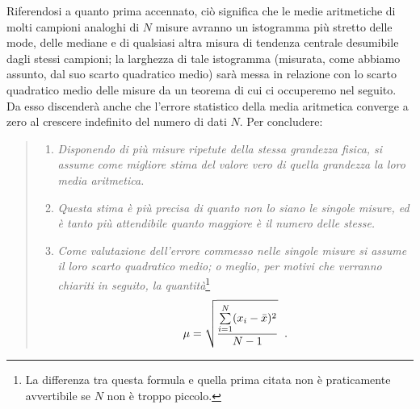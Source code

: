 Riferendosi a quanto prima accennato, ci\`o significa che le
medie aritmetiche di molti campioni analoghi di $N$ misure
avranno un istogramma pi\`u stretto delle mode, delle
mediane e di qualsiasi altra misura di tendenza centrale
desumibile dagli stessi campioni; la larghezza di tale
istogramma (misurata, come abbiamo assunto, dal suo scarto
quadratico medio) sar\`a messa in relazione con lo scarto
quadratico medio delle misure da un teorema di cui ci
occuperemo nel seguito.  Da esso discender\`a anche che
l'errore statistico della media aritmetica converge a zero
al crescere indefinito del numero di dati $N$.%
Per concludere:
\begin{quote}
  \begin{enumerate}
  \item \textit{Disponendo di pi\`u misure ripetute della
      stessa grandezza fisica, si assume come migliore stima
      del valore vero di quella grandezza la loro media
      aritmetica.}
  \item \textit{Questa stima \`e pi\`u precisa di quanto non
      lo siano le singole misure, ed \`e tanto pi\`u
      attendibile quanto maggiore \`e il numero delle
      stesse.}
  \item \textit{Come valutazione dell'errore commesso nelle
      singole misure si assume il loro scarto quadratico
      medio; o meglio, per motivi che verranno chiariti in
      seguito, la quantit\`a}\/\thinspace\footnote{La
      differenza tra questa formula e quella prima citata
      non \`e praticamente avvertibile se $N$ non \`e troppo
      piccolo.}
    \begin{equation*}
      \mu = \sqrt{ \frac{\sum \limits_{i=1}^N
          ( x_i - \bar x )^2 }{N-1} } \;\; .
    \end{equation*}
  \end{enumerate}
\end{quote}%

\endinput
